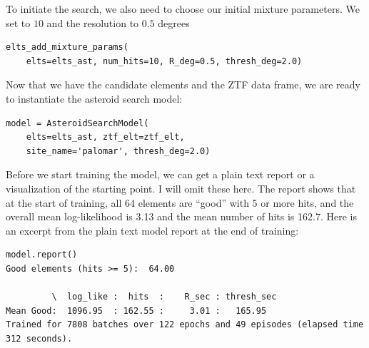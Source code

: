To initiate the search, we also need to choose our initial mixture parameters.
We set  to $10$ and the resolution to $0.5$ degrees
\begin{lstlisting}[style=CodeSnippet]
elts_add_mixture_params(
	elts=elts_ast, num_hits=10, R_deg=0.5, thresh_deg=2.0)
\end{lstlisting}
Now that we have the candidate elements and the ZTF data frame, we are ready to instantiate the asteroid search model:
\begin{lstlisting}[style=CodeSnippet]
model = AsteroidSearchModel(
	elts=elts_ast, ztf_elt=ztf_elt, 
	site_name='palomar', thresh_deg=2.0)
\end{lstlisting}
Before we start training the model, we can get a plain text report or a visualization of the starting point.
I will omit these here. 
The report shows that at the start of training, all 64 elements are ``good'' with 5 or more hits,
and the overall mean log-likelihood is 3.13 and the mean number of hits is 162.7.
Here is an excerpt from the plain text model report at the end of training:\\
\begin{minipage}{\linewidth}
\begin{lstlisting}[style=CodeSnippet]
model.report()
Good elements (hits >= 5):  64.00

         \  log_like :  hits  :    R_sec : thresh_sec
Mean Good:  1096.95  : 162.55 :     3.01 :   165.95
Trained for 7808 batches over 122 epochs and 49 episodes (elapsed time 312 seconds).
\end{lstlisting}
\end{minipage}

